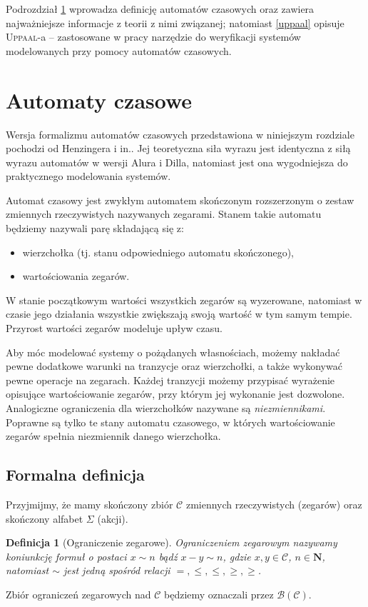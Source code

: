 \documentclass{pracamgr}
\newcommand{\upp}{\textsc{Uppaal}}
\theoremstyle{plain}
\newtheorem{definition}{Definicja}
\begin{document}
Podrozdział \ref{ta-theory} wprowadza definicję automatów czasowych
oraz zawiera najważniejsze informacje z teorii z nimi związanej;
natomiast \ref{uppaal} opisuje \upp-a -- zastosowane w pracy narzędzie
do weryfikacji systemów modelowanych przy pomocy automatów czasowych. 

\section{Automaty czasowe}
\label{ta-theory}

Wersja formalizmu automatów czasowych przedstawiona w niniejszym
rozdziale pochodzi od Henzingera i in.\cite{henz-94}. Jej teoretyczna
siła wyrazu jest identyczna z siłą wyrazu automatów w wersji Alura i
Dilla, natomiast jest ona wygodniejsza do praktycznego modelowania
systemów.

Automat czasowy jest zwykłym automatem skończonym rozszerzonym o
zestaw zmiennych rzeczywistych nazywanych zegarami. Stanem takie
automatu będziemy nazywali parę składającą się z:
\begin{itemize}
  \item wierzchołka (tj. stanu odpowiedniego automatu skończonego),
  \item wartościowania zegarów.
\end{itemize}
W stanie początkowym wartości wszystkich zegarów są wyzerowane,
natomiast w czasie jego działania wszystkie zwiększają swoją wartość w
tym samym tempie. Przyrost wartości zegarów modeluje upływ czasu.

Aby móc modelować systemy o pożądanych własnościach, możemy nakładać
pewne dodatkowe warunki na tranzycje oraz wierzchołki, a także
wykonywać pewne operacje na zegarach. Każdej tranzycji możemy
przypisać wyrażenie opisujące wartościowanie zegarów, przy którym jej
wykonanie jest dozwolone. Analogiczne ograniczenia dla wierzchołków
nazywane są \emph{niezmiennikami}. Poprawne są tylko te stany automatu
czasowego, w których wartościowanie zegarów spełnia niezmiennik danego
wierzchołka.


\subsection{Formalna definicja} Przyjmijmy, że mamy skończony zbiór
$\mathcal{C}$ zmiennych rzeczywistych (zegarów) oraz skończony alfabet
$\Sigma$ (akcji).

\begin{definition}[Ograniczenie zegarowe] Ograniczeniem zegarowym
nazywamy koniunkcję formuł o postaci $x \sim n$ bądź $x - y \sim n$,
gdzie $x, y \in \mathcal{C}$, $n \in \mathbf{N}$, natomiast $\sim$
jest jedną spośród relacji $=, \le, \leq, \ge, \geq$.
\end{definition}
Zbiór ograniczeń zegarowych nad $\mathcal{C}$ będziemy oznaczali przez
$\mathcal{B}(\mathcal{C})$.
\end{document}
